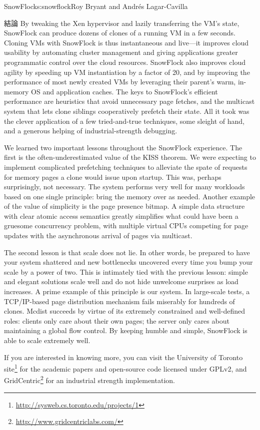 \begin{aosachapter}{SnowFlock}{s:snowflock}{Roy Bryant and Andr\'e{s} Lagar-Cavilla}
\begin{aosasect1}{結論}
By tweaking the Xen hypervisor and lazily transferring the VM's state,
SnowFlock can produce dozens of clones of a running VM in a few
seconds. Cloning VMs with SnowFlock is thus instantaneous and
live---it improves cloud usability by automating cluster management
and giving applications greater programmatic control over the cloud
resources. SnowFlock also improves cloud agility by speeding up VM
instantiation by a factor of 20, and by improving the performance of
most newly created VMs by leveraging their parent's warm, in-memory OS
and application caches. The keys to SnowFlock's efficient performance
are heuristics that avoid unnecessary page fetches, and the multicast
system that lets clone siblings cooperatively prefetch their
state. All it took was the clever application of a few tried-and-true
techniques, some sleight of hand, and a generous helping of
industrial-strength debugging.

We learned two important lessons throughout the SnowFlock experience.
The first is the often-underestimated value of the KISS theorem. We
were expecting to implement complicated prefetching techniques to
alleviate the spate of requests for memory pages a clone would issue
upon startup.  This was, perhaps surprisingly, not necessary. The
system performs very well for many workloads based on one single
principle: bring the memory over as needed.  Another example of the
value of simplicity is the page presence bitmap. A simple data
structure with clear atomic access semantics greatly simplifies what
could have been a gruesome concurrency problem, with multiple virtual
CPUs competing for page updates with the asynchronous arrival of pages
via multicast.

The second lesson is that scale does not lie. In other words, be
prepared to have your system shattered and new bottlenecks uncovered
every time you bump your scale by a power of two. This is intimately
tied with the previous lesson: simple and elegant solutions scale well
and do not hide unwelcome surprises as load increases. A prime example
of this principle is our  system. In large-scale tests, a
TCP/IP-based page distribution mechanism fails miserably for hundreds
of clones. Mcdist succeeds by virtue of its extremely constrained and
well-defined roles: clients only care about their own pages; the
server only cares about maintaining a global flow control. By keeping
 humble and simple, SnowFlock is able to scale extremely well.

If you are interested in knowing more, you can visit the University of
Toronto site\footnote{\url{http://sysweb.cs.toronto.edu/projects/1}} for the
academic papers and open-source code licensed under GPLv2, and
GridCentric\footnote{\url{http://www.gridcentriclabs.com/}} for an industrial strength
implementation.

\end{aosasect1}

\end{aosachapter}

